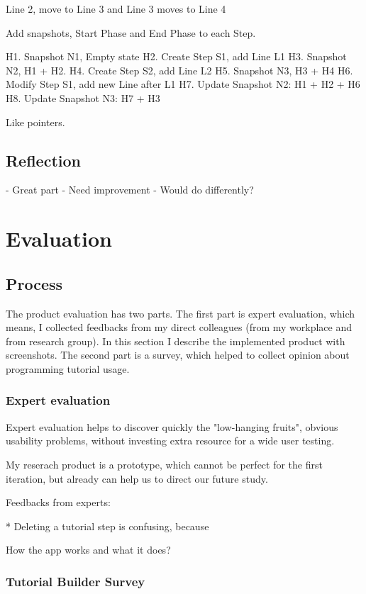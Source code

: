 \documentclass[12pt, a4paper, oneside, openright, medskipamount]{report}
\begin{document}
Line 2, move to Line 3 and Line 3 moves to Line 4

Add snapshots, Start Phase and End Phase to each Step.

H1. Snapshot N1, Empty state
H2. Create Step S1, add Line L1
H3. Snapshot N2, H1 + H2.
H4. Create Step S2, add Line L2
H5. Snapshot N3, H3 + H4
H6. Modify Step S1, add new Line after L1
H7. Update Snapshot N2: H1 + H2 + H6
H8. Update Snapshot N3: H7 + H3

Like pointers.


\section{Reflection}

- Great part
- Need improvement
- Would do differently?

\chapter{Evaluation}

\section{Process}

The product evaluation has two parts. The first part is expert evaluation, which means, I collected feedbacks from my direct colleagues (from my workplace and from research group). In this section I describe the implemented product with screenshots. The second part is a survey, which helped to collect opinion about programming tutorial usage.

\subsection{Expert evaluation}

Expert evaluation helps to discover quickly the "low-hanging fruits", obvious usability problems, without investing extra resource for a wide user testing.

My reserach product is a prototype, which cannot be perfect for the first iteration, but already can help us to direct our future study.

Feedbacks from experts:

* Deleting a tutorial step is confusing, because

How the app works and what it does?



\subsection{Tutorial Builder Survey}
\end{document}
